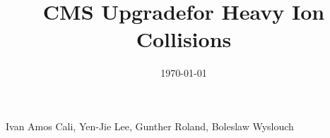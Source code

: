 \begin{titlepage}
\vspace{-.2 cm} 
\date{\today}
\vspace{2 cm}
\title{CMS Upgradefor Heavy Ion Collisions}

\vspace{.2 cm} 
\begin{Authlist}
Ivan Amos Cali\footnotemark[1],
Yen-Jie Lee\footnotemark[1], 
Gunther Roland\footnotemark[1], 
Boleslaw Wyslouch\footnotemark[1]
\end{Authlist}



\end{titlepage}





